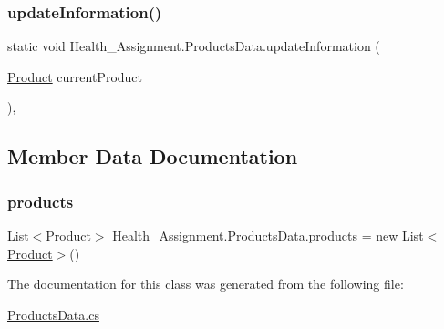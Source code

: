 \subsubsection{\texorpdfstring{update\+Information()}{updateInformation()}}
{\footnotesize\ttfamily static void Health\+\_\+\+Assignment.\+Products\+Data.\+update\+Information (\begin{DoxyParamCaption}\item[{\hyperlink{class_health___assignment_1_1_product}{Product}}]{current\+Product }\end{DoxyParamCaption})\hspace{0.3cm}{\ttfamily [inline]}, {\ttfamily [static]}}



\subsection{Member Data Documentation}
\mbox{\label{class_health___assignment_1_1_products_data_a85fc48a6b266af5838f5950b48178166}} 
\subsubsection{\texorpdfstring{products}{products}}
{\footnotesize\ttfamily List$<$\hyperlink{class_health___assignment_1_1_product}{Product}$>$ Health\+\_\+\+Assignment.\+Products\+Data.\+products = new List$<$\hyperlink{class_health___assignment_1_1_product}{Product}$>$()\hspace{0.3cm}{\ttfamily [static]}}



The documentation for this class was generated from the following file\+:\begin{DoxyCompactItemize}
\item 
\hyperlink{_products_data_8cs}{Products\+Data.\+cs}\end{DoxyCompactItemize}
